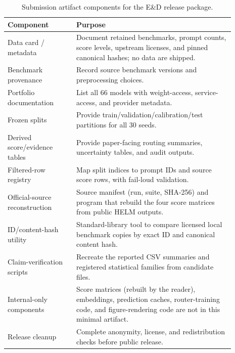 \documentclass{article}
\begin{document}
\begin{table}[htbp]
  \caption{Submission artifact components for the E\&D release package.}
  \label{tab:app-artifact-plan}
  \centering
  \small
  \begin{tabular}{p{0.27\linewidth} p{0.62\linewidth}}
    \toprule
    Component & Purpose \\
    \midrule
    Data card / metadata & Document retained benchmarks, prompt counts, score levels, upstream licenses, and pinned canonical hashes; no data are shipped. \\
    Benchmark provenance & Record source benchmark versions and preprocessing choices. \\
    Portfolio documentation & List all 66 models with weight-access, service-access, and provider metadata. \\
    Frozen splits & Provide train/validation/calibration/test partitions for all 30 seeds. \\
    Derived score/evidence tables & Provide paper-facing routing summaries, uncertainty tables, and audit outputs. \\
    Filtered-row registry & Map split indices to prompt IDs and source score rows, with fail-loud validation. \\
    Official-source reconstruction & Source manifest (run, suite, SHA-256) and program that rebuild the four score matrices from public HELM outputs. \\
    ID/content-hash utility & Standard-library tool to compare licensed local benchmark copies by exact ID and canonical content hash. \\
    Claim-verification scripts & Recreate the reported CSV summaries and registered statistical families from candidate files. \\
    Internal-only components & Score matrices (rebuilt by the reader), embeddings, prediction caches, router-training code, and figure-rendering code are not in this minimal artifact. \\
    Release cleanup & Complete anonymity, license, and redistribution checks before public release. \\
    \bottomrule
  \end{tabular}
\end{table}
\end{document}
